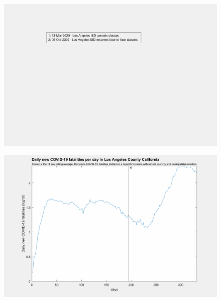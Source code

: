 \documentclass[]{article}
\begin{document}
\begin{figure}[!h]
	\includegraphics[width=\linewidth]{legends/los_angeles_school_legend.png}
	\caption{}
	\label{fig:legends/los_angeles_school_legendLabel}
\end{figure}

\begin{figure}[!h]
	\includegraphics[width=\linewidth]{images/los_angeles_fatalities_school_log.png}
	\caption{}
	\label{fig:images/los_angeles_fatalities_school_logLabel}
\end{figure}
\end{document}
